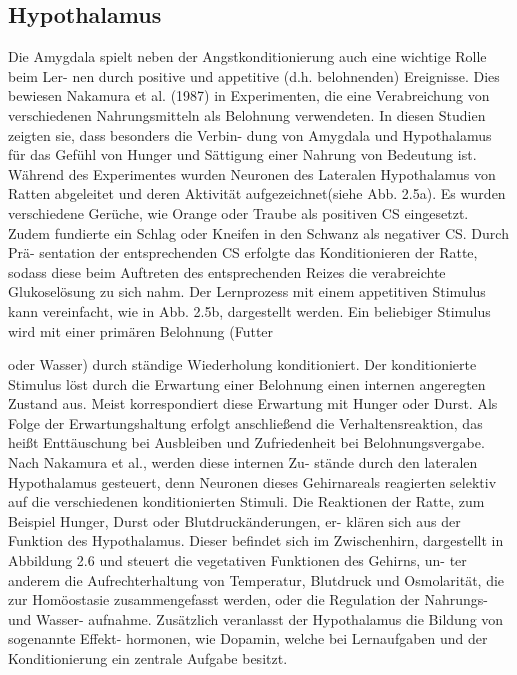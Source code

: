\subsection{ Hypothalamus}
Die Amygdala spielt neben der Angstkonditionierung auch eine wichtige Rolle beim Ler-
nen durch positive und appetitive (d.h. belohnenden) Ereignisse. Dies bewiesen Nakamura
et al. (1987) in Experimenten, die eine Verabreichung von verschiedenen Nahrungsmitteln
als Belohnung verwendeten. In diesen Studien zeigten sie, dass besonders die Verbin-
dung von Amygdala und Hypothalamus für das Gefühl von Hunger und Sättigung einer
Nahrung von Bedeutung ist. Während des Experimentes wurden Neuronen des Lateralen
Hypothalamus von Ratten abgeleitet und deren Aktivität aufgezeichnet(siehe Abb. 2.5a).
Es wurden verschiedene Gerüche, wie Orange oder Traube als positiven CS eingesetzt.
Zudem fundierte ein Schlag oder Kneifen in den Schwanz als negativer CS. Durch Prä-
sentation der entsprechenden CS erfolgte das Konditionieren der Ratte, sodass diese beim
Auftreten des entsprechenden Reizes die verabreichte Glukoselösung zu sich nahm.
Der Lernprozess mit einem appetitiven Stimulus kann vereinfacht, wie in Abb. 2.5b,
dargestellt werden. Ein beliebiger Stimulus wird mit einer primären Belohnung (Futter


oder Wasser) durch ständige Wiederholung konditioniert. Der konditionierte Stimulus
löst durch die Erwartung einer Belohnung einen internen angeregten Zustand aus. Meist
korrespondiert diese Erwartung mit Hunger oder Durst. Als Folge der Erwartungshaltung
erfolgt anschließend die Verhaltensreaktion, das heißt Enttäuschung bei Ausbleiben und
Zufriedenheit bei Belohnungsvergabe. Nach Nakamura et al., werden diese internen Zu-
stände durch den lateralen Hypothalamus gesteuert, denn Neuronen dieses Gehirnareals
reagierten selektiv auf die verschiedenen konditionierten Stimuli.
Die Reaktionen der Ratte, zum Beispiel Hunger, Durst oder Blutdruckänderungen, er-
klären sich aus der Funktion des Hypothalamus. Dieser befindet sich im Zwischenhirn,
dargestellt in Abbildung 2.6 und steuert die vegetativen Funktionen des Gehirns, un-
ter anderem die Aufrechterhaltung von Temperatur, Blutdruck und Osmolarität, die zur
Homöostasie zusammengefasst werden, oder die Regulation der Nahrungs- und Wasser-
aufnahme. Zusätzlich veranlasst der Hypothalamus die Bildung von sogenannte Effekt-
hormonen, wie Dopamin, welche bei Lernaufgaben und der Konditionierung ein zentrale
Aufgabe besitzt.
